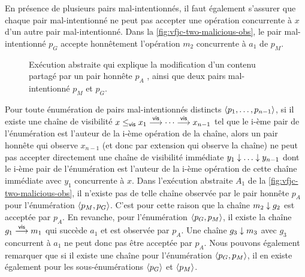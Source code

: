En présence de plusieurs pairs mal-intentionnés, il faut également s'assurer que chaque pair mal-intentionné ne peut pas accepter une opération concurrente à $x$ d'un autre pair mal-intentionné.
Dans la \autoref{fig:vfjc-two-malicious-obs}, le pair mal-intentionné $p_G$ accepte honnêtement l'opération $m_2$ concurrente à $a_1$ de $p_M$.

\begin{figure}[htb]
\centering
{}
\caption{Exécution abstraite qui explique la modification d'un contenu partagé par un pair honnête $p_A$ , ainsi que deux pairs mal-intentionné $p_M$ et $p_G$.}
\label{fig:vfjc-two-malicious-obs}
\end{figure}

Pour toute énumération de pairs mal-intentionnés distincts $\tuple*{p_1, \dotsc ,p_{n-1}}$, si il existe une chaîne de visibilité $x \viseq x_1 \vis \dotsb \vis x_{n-1}$ tel que le i-ème pair de l'énumération est l'auteur de la i-ème opération de la chaîne, alors un pair honnête qui observe $x_{n-1}$ (et donc par extension qui observe la chaîne) ne peut pas accepter directement une chaîne de visibilité immédiate $y_1 \idr \dotsc \idr y_{n-1}$ dont le i-ème pair de l'énumération est l'auteur de la i-ème opération de cette chaîne immédiate avec $y_1$ concurrente à $x$.
Dans l'exécution abstraite $A_1$ de la \autoref{fig:vfjc-two-malicious-obs}, il n'existe pas de telle chaîne observée par le pair honnête $p_A$ pour l'énumération $\tuple*{p_M, p_G}$.
C'est pour cette raison que la chaîne $m_2 \idr g_2$ est acceptée par $p_A$.
En revanche, pour l'énumération $\tuple*{p_G, p_M}$, il existe la chaîne $g_1 \vis m_1$ qui succède $a_1$ et est observée par $p_A$.
Une chaîne $g_3 \idr m_3$ avec $g_3$ concurrent à $a_1$ ne peut donc pas être acceptée par $p_A$.
Nous pouvons également remarquer que si il existe une chaîne pour l'énumération $\tuple*{p_G, p_M}$, il en existe également pour les sous-énumérations $\tuple*{p_G}$ et $\tuple*{p_M}$.

